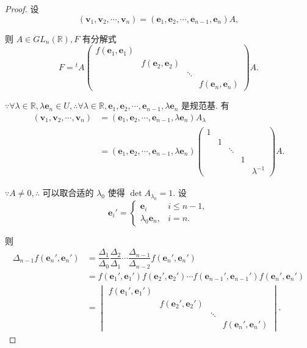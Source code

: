 \documentclass[color=black,device=normal,lang=cn,mode=geye]{elegantnote}
\begin{document}
\begin{proof}
    设
    \[(\boldsymbol{v}_1,\boldsymbol{v}_2,\cdots,\boldsymbol{v}_n)=(\boldsymbol{e}_1,\boldsymbol{e}_2,\cdots,\boldsymbol{e}_{n-1},\boldsymbol{e}_n)A,\]

    则 $A\in GL_n(\mathbb{R}),F$ 有分解式
    \begin{equation}\label{eq3.3}
        F={}^tA\begin{pmatrix}
            f(\boldsymbol{e}_1,\boldsymbol{e}_1) \\
            & f(\boldsymbol{e}_2,\boldsymbol{e}_2) \\
            && \ddots \\
            &&& f(\boldsymbol{e}_n,\boldsymbol{e}_n)
        \end{pmatrix}A.
    \end{equation}

    $\because\forall\lambda\in\mathbb{R},\lambda\boldsymbol{e}_n\in U,\therefore\forall\lambda\in\mathbb{R},\boldsymbol{e}_1,\boldsymbol{e}_2,\cdots,\boldsymbol{e}_{n-1},\lambda\boldsymbol{e}_n$ 是规范基. 有
    \begin{align*}
        (\boldsymbol{v}_1,\boldsymbol{v}_2,\cdots,\boldsymbol{v}_n) & =(\boldsymbol{e}_1,\boldsymbol{e}_2,\cdots,\boldsymbol{e}_{n-1},\lambda\boldsymbol{e}_n)A_\lambda \\
        & =(\boldsymbol{e}_1,\boldsymbol{e}_2,\cdots,\boldsymbol{e}_{n-1},\lambda\boldsymbol{e}_n)\begin{pmatrix}
            1 \\
            & 1 \\
            && \ddots \\
            &&& 1 \\
            &&&& \lambda^{-1}
        \end{pmatrix}A.
    \end{align*}

    $\because A\neq0,\therefore$ 可以取合适的 $\lambda_0$ 使得 $\det A_{\lambda_0}=1$. 设
    \[\boldsymbol{e}_i'=\begin{cases}
        \boldsymbol{e}_i & i\leq n-1, \\
        \lambda_0\boldsymbol{e}_n, & i=n.
    \end{cases}\]

    则
    \begin{align*}
        \Delta_{n-1}f(\boldsymbol{e}_n',\boldsymbol{e}_n') & =\dfrac{\Delta_1}{\Delta_0}\dfrac{\Delta_2}{\Delta_1}\cdots\dfrac{\Delta_{n-1}}{\Delta_{n-2}}f(\boldsymbol{e}_n',\boldsymbol{e}_n') \\
        & =f(\boldsymbol{e}_1',\boldsymbol{e}_1')f(\boldsymbol{e}_2',\boldsymbol{e}_2')\cdots f(\boldsymbol{e}_{n-1}',\boldsymbol{e}_{n-1}')f(\boldsymbol{e}_n',\boldsymbol{e}_n') \\
        & =\begin{vmatrix}
            f(\boldsymbol{e}_1',\boldsymbol{e}_1') \\
            & f(\boldsymbol{e}_2',\boldsymbol{e}_2') \\
            && \ddots \\
            &&& f(\boldsymbol{e}_n',\boldsymbol{e}_n')
        \end{vmatrix}.
    \end{align*}


\end{proof}
\end{document}
